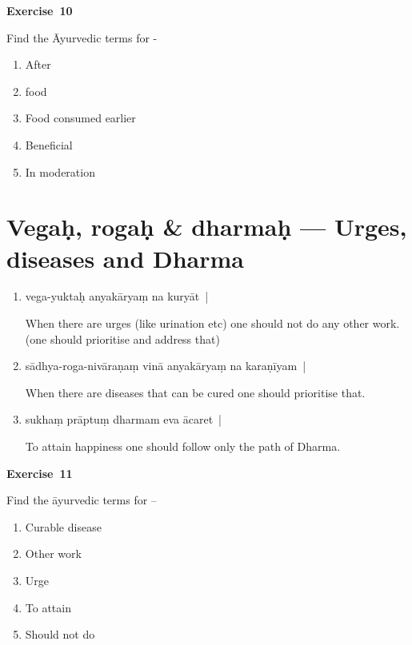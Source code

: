 \centerline{\textbf{Exercise~10}}

Find the Āyurvedic terms for - 
\begin{enumerate}
\itemsep=0pt
\renewcommand{\theenumi}{\alph{enumi}}
\renewcommand{\labelenumi}{\theenumi.}
\item After
\item food 
\item Food consumed earlier
\item Beneficial
\item In moderation
\end{enumerate}

\chapter{Vegaḥ, rogaḥ \& dharmaḥ --- Urges, diseases and Dharma}

\begin{enumerate}
\itemsep=0pt
\item {}

vega-yuktaḥ anyakāryaṃ na kuryāt~|

When there are urges (like urination etc) one should not do any other work. (one should prioritise and address that)

\item {}

sādhya-roga-nivāraṇaṃ vinā anyakāryaṃ na karaṇīyam~| 

When there are diseases that can be cured one should prioritise that.

\item {}

sukhaṃ prāptuṃ dharmam eva ācaret~| 

To attain happiness one should follow only  the path of Dharma.
\end{enumerate}

\centerline{\textbf{Exercise~11}}

Find the āyurvedic terms for –
\begin{enumerate}
\itemsep=0pt
\renewcommand{\theenumi}{\alph{enumi}}
\renewcommand{\labelenumi}{\theenumi.}
\item Curable disease
\item Other work
\item Urge
\item To attain
\item Should not do
\end{enumerate}

